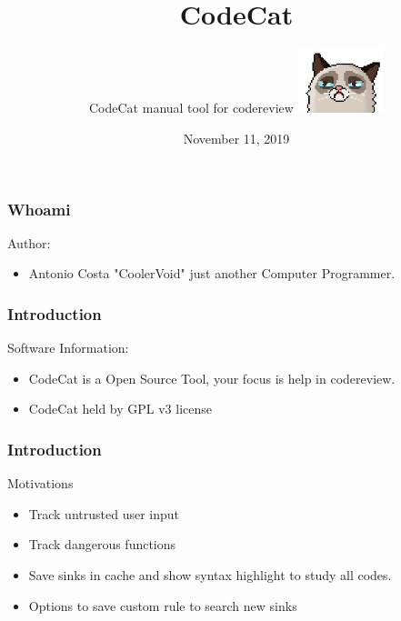 \documentclass[serif,mathserif]{beamer}
\author[CodeCat v0.1]{ CodeCat manual tool for codereview \quad \includegraphics[width=2.5cm]{images/codecat00.png} }
\title[ Page \hspace{2em}\insertframenumber/\inserttotalframenumber]{CodeCat}
\date{November 11, 2019}
\institute{Antonio Costa - CoolerVoid - coolerlair[aT]gmail[DOt]com}
\begin{document}
\maketitle



\begin{frame}
  \frametitle{Whoami}
  Author:
  \begin{itemize}  \item Antonio Costa "CoolerVoid" just another Computer Programmer.
  \end{itemize}
  \begin{figure}[t]
    \centering
  \end{figure}
\end{frame}


\begin{frame}
  \frametitle{Introduction}
  Software Information:
  \begin{itemize}
  \item  CodeCat is a Open Source Tool, your focus is help in codereview. 
  \item  CodeCat held by GPL v3 license
  \end{itemize}
\end{frame}



\begin{frame}
  \frametitle{Introduction}
  Motivations
  \begin{itemize}
  \item  Track untrusted user input 
  \item  Track dangerous functions
  \item  Save sinks in cache and show syntax highlight to study all codes.
  \item  Options to save custom rule to search new sinks	  
  \end{itemize}
\end{frame}
\end{document}
